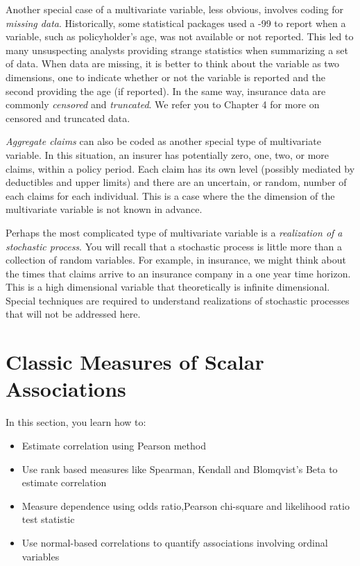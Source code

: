 \documentclass[]{book}
\providecommand{\tightlist}{%
  \setlength{\itemsep}{0pt}\setlength{\parskip}{0pt}}
\theoremstyle{definition}
\theoremstyle{definition}
\theoremstyle{definition}
\theoremstyle{remark}
\begin{document}
Another special case of a multivariate variable, less obvious, involves
coding for \emph{missing data}. Historically, some statistical packages
used a -99 to report when a variable, such as policyholder's age, was
not available or not reported. This led to many unsuspecting analysts
providing strange statistics when summarizing a set of data. When data
are missing, it is better to think about the variable as two dimensions,
one to indicate whether or not the variable is reported and the second
providing the age (if reported). In the same way, insurance data are
commonly \emph{censored} and \emph{truncated}. We refer you to Chapter 4
for more on censored and truncated data.

\emph{Aggregate claims} can also be coded as another special type of
multivariate variable. In this situation, an insurer has potentially
zero, one, two, or more claims, within a policy period. Each claim has
its own level (possibly mediated by deductibles and upper limits) and
there are an uncertain, or random, number of each claims for each
individual. This is a case where the the dimension of the multivariate
variable is not known in advance.

Perhaps the most complicated type of multivariate variable is a
\emph{realization of a stochastic process}. You will recall that a
stochastic process is little more than a collection of random variables.
For example, in insurance, we might think about the times that claims
arrive to an insurance company in a one year time horizon. This is a
high dimensional variable that theoretically is infinite dimensional.
Special techniques are required to understand realizations of stochastic
processes that will not be addressed here.

\section{Classic Measures of Scalar Associations}\label{S:Measures}

In this section, you learn how to:

\begin{itemize}
\tightlist
\item
  Estimate correlation using Pearson method
\item
  Use rank based measures like Spearman, Kendall and Blomqvist's Beta to
  estimate correlation
\item
  Measure dependence using odds ratio,Pearson chi-square and likelihood
  ratio test statistic
\item
  Use normal-based correlations to quantify associations involving
  ordinal variables
\end{itemize}
\end{document}
